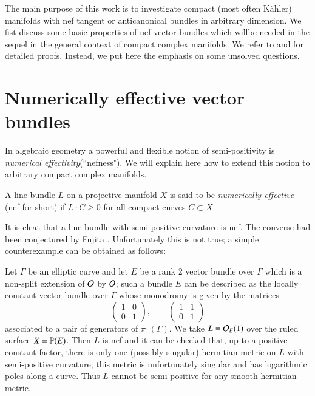 The main purpose of this work is to investigate compact (most often K\"ahler) manifolds with nef tangent or anticanonical bundles in arbitrary dimension. We fist discuss some basic properties of nef vector bundles which will\pageoriginale be needed in the sequel in the general context of compact complex manifolds. We refer to \cite{chap5-keyDPS91} and  \cite{chap5-keyDPS92} for detailed proofs. Instead, we put here the emphasis on some unsolved questions.

\section{Numerically effective vector bundles}\label{chap5-sec-1}

In algebraic geometry a powerful and flexible notion of semi-positivity is \textit{numerical effectivity}(``nefness"). We will explain here how to extend this notion to arbitrary compact complex manifolds.

\begin{definition}\label{chap5-definition-1.1}
A line bundle $L$ on a projective manifold $X$ is said to be \textit{numerically effective} (nef for short) if $L\cdot C \geq 0$ for all compact curves $C \subset X$.
\end{definition}

It is cleat that a line bundle with semi-positive curvature is nef. The converse had been conjectured by Fujita \cite{chap5-keyFu83}. Unfortunately this is not true; a simple counterexample can be obtained as follows:

\begin{secexam}\label{chap5-example-1.2}
Let $\Gamma$ be an elliptic curve and let $E$ be a rank 2 vector bundle over $\Gamma$ which is a non-split extension of $\mathcal{O}$ by $\mathcal{O}$; such a bundle $E$ can be described as the locally constant vector bundle over $\Gamma$ whose monodromy is given by the matrices
$$
\begin{pmatrix}
1 & 0\\
0 & 1
\end{pmatrix}
,\qquad
\begin{pmatrix}
1 & 1\\
0 & 1
\end{pmatrix}
$$
associated to a pair of generators of $\pi_{1}(\Gamma)$. We take $L=\mathcal{O}_{E}(1)$ over the ruled surface $X= \mathbb{P}(E)$. Then $L$ is nef and it can be checked that, up to a positive constant factor, there is only one (possibly singular) hermitian metric on $L$ with semi-positive curvature; this metric is  unfortunately singular and has logarithmic poles along a curve. Thus $L$ cannot be semi-positive for any smooth hermitian metric. 
\end{secexam}

